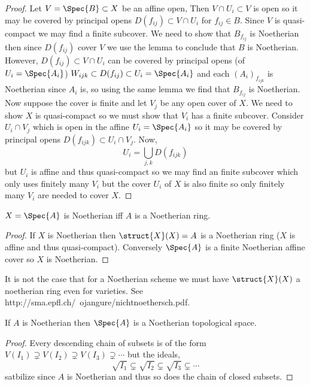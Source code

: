 \documentclass[12pt]{article}
\begin{document}
\begin{proof}
Let $V = \Spec{B} \subset X$ be an affine open, Then $V \cap U_i \subset V$ is open so it may be covered by principal opens $D(f_{ij}) \subset V \cap U_i$ for $f_{ij} \in B$. Since $V$ is quasi-compact we may find a finite subcover. We need to show that $B_{f_{ij}}$ is Noetherian then since $D(f_{ij})$ cover $V$ we use the lemma to conclude that $B$ is Noetherian. However, $D(f_{ij}) \subset V \cap U_i$ can be covered by principal opens (of $U_i = \Spec{A_i}$) $W_{ijk} \subset D(f_{ij}) \subset U_i = \Spec{A_i}$ and each $(A_i)_{f_{ijk}}$ is Noetherian since $A_i$ is, so using the same lemma we find that $B_{f_{ij}}$ is Noetherian. 
\bigskip\\
Now suppose the cover is finite and let $V_j$ be any open cover of $X$. We need to show $X$ is quasi-compact so we must show that $V_i$ has a finite subcover. Consider $U_i \cap V_j$  which is open in the affine $U_i = \Spec{A_i}$ so it may be covered by principal opens $D(f_{ijk}) \subset U_i \cap V_j$. Now,
\[ U_i = \bigcup_{j,k} D(f_{ijk}) \]
but $U_i$ is affine and thus quasi-compact so we may find an finite subcover which only uses finitely many $V_i$ but the cover $U_i$ of $X$ is also finite so only finitely many $V_i$ are needed to cover $X$.  
\end{proof}

\begin{cor}
$X = \Spec{A}$ is Noetherian iff $A$ is a Noetherian ring.
\end{cor}

\begin{proof}
If $X$ is Noetherian then $\struct{X}(X) = A$ is a Noetherian ring ($X$ is affine and thus quasi-compact). Conversely $\Spec{A}$ is a finite Noetherian affine cover so $X$ is Noetherian.
\end{proof}

\begin{rmk}
It is not the case that for a Noetherian scheme we must have $\struct{X}(X)$ a noetherian ring even for varieties. See http://sma.epfl.ch/~ojangure/nichtnoethersch.pdf. 
\end{rmk}

\begin{lemma}
If $A$ is Noetherian then $\Spec{A}$ is a Noetherian topological space.
\end{lemma}

\begin{proof}
Every descending chain of subsets is of the form $V(I_1) \supsetneq V(I_2) \supsetneq V(I_3) \supsetneq \cdots$ but the ideals,
\[ \sqrt{I_1} \subsetneq \sqrt{I_2} \subsetneq \sqrt{I_3} \subsetneq \cdots \]
satbilize since $A$ is Noetherian and thus so does the chain of closed subsets.
\end{proof}
\end{document}
